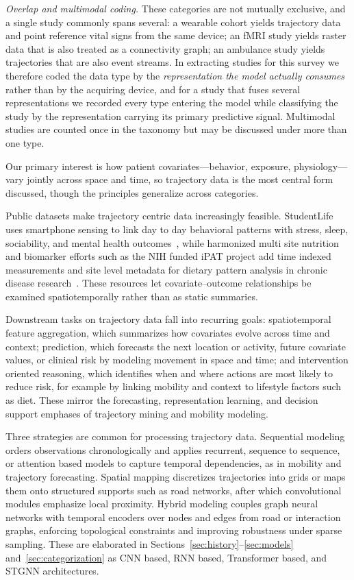\documentclass[journal]{IEEEtran}
\begin{document}
\emph{Overlap and multimodal coding.} These categories are not mutually exclusive, and a single study commonly spans several: a wearable cohort yields trajectory data and point reference vital signs from the same device; an fMRI study yields raster data that is also treated as a connectivity graph; an ambulance study yields trajectories that are also event streams. In extracting studies for this survey we therefore coded the data type by the \emph{representation the model actually consumes} rather than by the acquiring device, and for a study that fuses several representations we recorded every type entering the model while classifying the study by the representation carrying its primary predictive signal. Multimodal studies are counted once in the taxonomy but may be discussed under more than one type.

Our primary interest is how patient covariates---behavior, exposure, physiology---vary jointly across space and time, so trajectory data is the most central form discussed, though the principles generalize across categories.

Public datasets make trajectory centric data increasingly feasible. StudentLife uses smartphone sensing to link day to day behavioral patterns with stress, sleep, sociability, and mental health outcomes~\cite{wang2014studentlife}, while harmonized multi site nutrition and biomarker efforts such as the NIH funded iPAT project add time indexed measurements and site level metadata for dietary pattern analysis in chronic disease research~\cite{Fang2021iPAT}. These resources let covariate--outcome relationships be examined spatiotemporally rather than as static summaries.

Downstream tasks on trajectory data fall into recurring goals: spatiotemporal feature aggregation, which summarizes how covariates evolve across time and context; prediction, which forecasts the next location or activity, future covariate values, or clinical risk by modeling movement in space and time; and intervention oriented reasoning, which identifies when and where actions are most likely to reduce risk, for example by linking mobility and context to lifestyle factors such as diet. These mirror the forecasting, representation learning, and decision support emphases of trajectory mining and mobility modeling.

Three strategies are common for processing trajectory data. Sequential modeling orders observations chronologically and applies recurrent, sequence to sequence, or attention based models to capture temporal dependencies, as in mobility and trajectory forecasting. Spatial mapping discretizes trajectories into grids or maps them onto structured supports such as road networks, after which convolutional modules emphasize local proximity. Hybrid modeling couples graph neural networks with temporal encoders over nodes and edges from road or interaction graphs, enforcing topological constraints and improving robustness under sparse sampling. These are elaborated in Sections~\ref{sec:history}--\ref{sec:models} and~\ref{sec:categorization} as CNN based, RNN based, Transformer based, and STGNN architectures.
\end{document}
